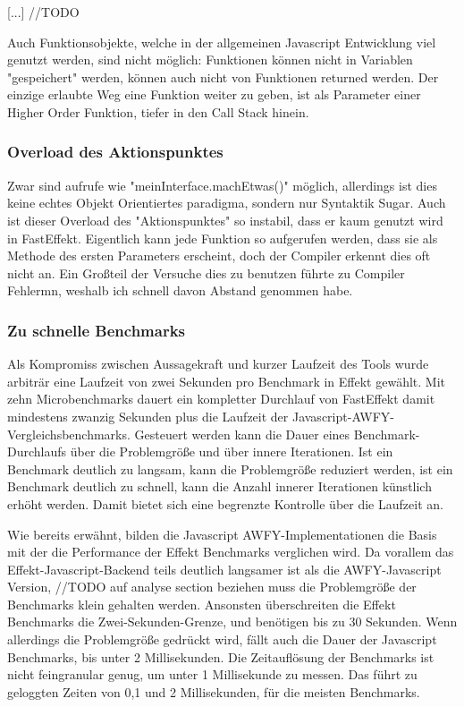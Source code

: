 [...] //TODO


Auch Funktionsobjekte, welche in der allgemeinen Javascript Entwicklung viel genutzt werden, sind nicht möglich: Funktionen können nicht in Variablen "gespeichert" werden, können auch nicht von Funktionen returned werden.
Der einzige erlaubte Weg eine Funktion weiter zu geben, ist als Parameter einer Higher Order Funktion, tiefer in den Call Stack hinein.

\subsubsection{ Overload des Aktionspunktes }
Zwar sind aufrufe wie "meinInterface.machEtwas()" möglich, allerdings ist dies keine echtes Objekt Orientiertes paradigma, sondern nur Syntaktik Sugar.
Auch ist dieser Overload des "Aktionspunktes" so instabil, dass er kaum genutzt wird in FastEffekt. Eigentlich kann jede Funktion so aufgerufen werden, dass sie als Methode des ersten Parameters erscheint, 
doch der Compiler erkennt dies oft nicht an. Ein Großteil der Versuche dies zu benutzen führte zu Compiler Fehlermn, weshalb ich schnell davon Abstand genommen habe.

\subsubsection{ Zu schnelle Benchmarks }
Als Kompromiss zwischen Aussagekraft und kurzer Laufzeit des Tools wurde arbiträr eine Laufzeit von zwei Sekunden pro Benchmark in Effekt gewählt.
Mit zehn Microbenchmarks dauert ein kompletter Durchlauf von FastEffekt damit mindestens zwanzig Sekunden plus die Laufzeit der Javascript-AWFY-Vergleichsbenchmarks.
Gesteuert werden kann die Dauer eines Benchmark-Durchlaufs über die Problemgröße und über innere Iterationen. Ist ein Benchmark deutlich zu langsam, kann die Problemgröße reduziert werden, ist ein Benchmark deutlich zu schnell, kann die Anzahl innerer Iterationen künstlich erhöht werden. Damit bietet sich eine begrenzte Kontrolle über die Laufzeit an.

Wie bereits erwähnt, bilden die Javascript AWFY-Implementationen die Basis mit der die Performance der Effekt Benchmarks verglichen wird.
Da vorallem das Effekt-Javascript-Backend teils deutlich langsamer ist als die AWFY-Javascript Version, //TODO auf analyse section beziehen
 muss die Problemgröße der Benchmarks klein gehalten werden. Ansonsten überschreiten die Effekt Benchmarks die Zwei-Sekunden-Grenze, und benötigen bis zu 30 Sekunden. Wenn allerdings die Problemgröße gedrückt wird, fällt auch die Dauer der Javascript Benchmarks, bis unter 2 Millisekunden. Die Zeitauflösung der Benchmarks ist nicht feingranular genug, um unter 1 Millisekunde zu messen. Das führt zu geloggten Zeiten von 0,1 und 2 Millisekunden, für die meisten Benchmarks. 

